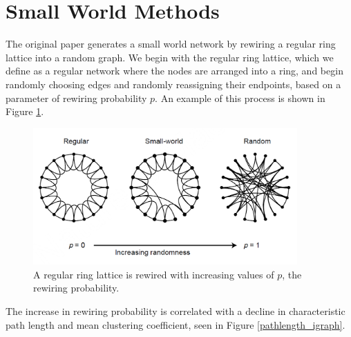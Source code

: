 \documentclass[12pt, openany]{book}
\theoremstyle{definition}
\theoremstyle{remark}
\numberwithin{equation}{chapter}
\numberwithin{figure}{chapter}
\begin{document}
\section{Small World Methods}

The original paper \citep{watts1998collective} generates a small world network by rewiring a regular ring lattice into a random graph. We begin with the regular ring lattice, which we define as a regular network where the nodes are arranged into a ring, and begin randomly choosing edges and randomly reassigning their endpoints, based on a parameter of rewiring probability $p$. An example of this process is shown in Figure \ref{smallworld}. 

\begin{figure}[t!]
\begin{center}
       \includegraphics[width=0.9\textwidth]{smallworld.png}
       \caption{A regular ring lattice is rewired with increasing values of $p$, the rewiring probability. \label{smallworld}}
\end{center}
\end{figure}  

The increase in rewiring probability is correlated with a decline in characteristic path length and mean clustering coefficient, seen in Figure \ref{pathlength_igraph}.
\end{document}
